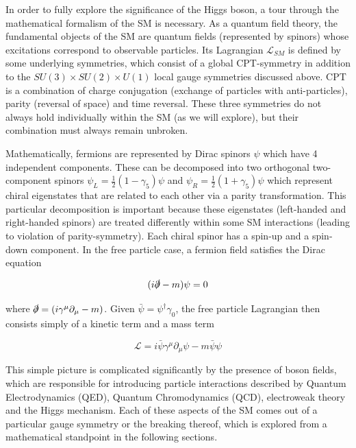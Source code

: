 In order to fully explore the significance of the Higgs boson, a tour through the mathematical formalism of the 
SM is necessary. As a quantum field theory, the fundamental objects of the SM are quantum fields (represented 
by spinors) whose excitations correspond to observable particles. Its Lagrangian $\mathcal{L}_{SM}$ is defined 
by some underlying symmetries, which consist of a global CPT-symmetry in addition to the 
$SU(3)\times SU(2)\times U(1)$ local gauge symmetries discussed above. CPT is a combination of charge 
conjugation (exchange of particles with anti-particles), parity (reversal of space) and time reversal. These three 
symmetries do not always hold individually within the SM (as we will explore), but their combination must always 
remain unbroken. \par

Mathematically, fermions are represented by Dirac spinors $\psi$ which have 4 independent components. 
These can be decomposed into two orthogonal two-component spinors $\psi_L = \frac{1}{2}(1-\gamma_5)\psi$ 
and $\psi_R = \frac{1}{2}(1+\gamma_5)\psi$ which represent chiral eigenstates that are related to each other 
via a parity transformation. This particular decomposition is important because these eigenstates (left-handed 
and right-handed spinors) are treated differently within some SM interactions (leading to violation of 
parity-symmetry). Each chiral spinor has a spin-up and a spin-down component. In the free particle case, a 
fermion field satisfies the Dirac equation 

\begin{equation}
(i\slashed{\partial} - m)\psi = 0
\end{equation}

where $\slashed{\partial} = (i\gamma^{\mu}\partial_{\mu} - m)$. Given $\bar{\psi} = \psi^{\dag}\gamma_0$, 
the free particle Lagrangian then consists simply of a kinetic term and a mass term

\begin{equation}
\mathcal{L} = i\bar{\psi}\gamma^{\mu}\partial_{\mu}\psi - m\bar{\psi}\psi
\end{equation}

This simple picture is complicated significantly by the presence of boson fields, which are responsible for 
introducing particle interactions described by Quantum Electrodynamics (QED), Quantum Chromodynamics 
(QCD), electroweak theory and the Higgs mechanism. Each of these aspects of the SM comes out of a particular 
gauge symmetry or the breaking thereof, which is explored from a mathematical standpoint in the following 
sections.

